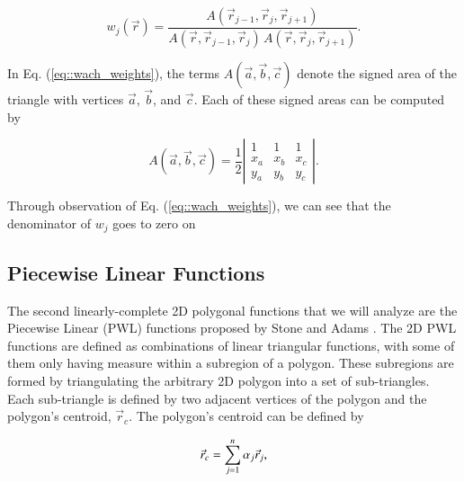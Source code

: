 \documentclass[preprint,10pt]{elsarticle}
\begin{document}
\begin{equation}
\label{eq::wach_weights}
w_j (\vec{r})  = \frac{A(\vec{r}_{j-1}, \vec{r}_{j}, \vec{r}_{j+1})}{A(\vec{r}, \vec{r}_{j-1}, \vec{r}_{j}) \, A(\vec{r}, \vec{r}_{j}, \vec{r}_{j+1})} .
\end{equation}

\noindent In Eq. (\ref{eq::wach_weights}), the terms $A(\vec{a}, \vec{b}, \vec{c})$ denote the signed area of the triangle with vertices $\vec{a}$, $\vec{b}$, and $\vec{c}$. Each of these signed areas can be computed by

\begin{equation}
\label{eq::wach_signed_area}
A(\vec{a}, \vec{b}, \vec{c}) = \frac{1}{2}
\left|  
  \begin{array}{ccc}
  1 & 1 & 1 \\
  x_a & x_b & x_c \\
  y_a & y_b & y_c
  \end{array}
\right| .
\end{equation}

\noindent Through observation of Eq. (\ref{eq::wach_weights}), we can see that the denominator of $w_j$ goes to zero on 

\subsection{Piecewise Linear Functions}

The second linearly-complete 2D polygonal functions that we will analyze are the Piecewise Linear (PWL) functions proposed by Stone and Adams \cite{ref::PWLD_stone_adams,ref::PWLD_stone_adams_unstructured}. The 2D PWL functions are defined as combinations of linear triangular functions, with some of them only having measure within a subregion of a polygon. These subregions are formed by triangulating the arbitrary 2D polygon into a set of sub-triangles.  Each sub-triangle is defined by two adjacent vertices of the polygon and the polygon's centroid, $\vec{r}_{c}$. The polygon's centroid can be defined by

\begin{equation}
\label{eq::PWL_2D_centroid}
	\vec{r}_{c} =  \sum\displaylimits_{j=1}^{n} \alpha_{j} \vec{r}_j ,
\end{equation}
\end{document}
